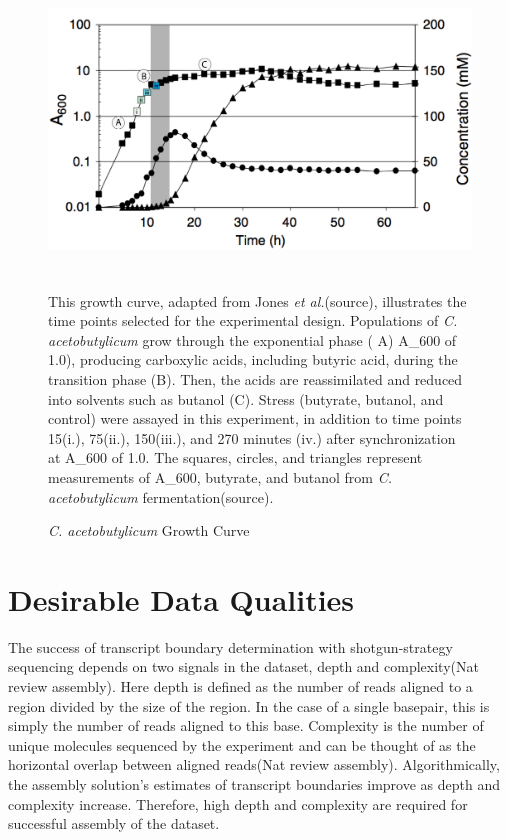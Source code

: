 \begin{figure}[t]
\small
\includegraphics[width=\textwidth,height=3in]{images/Sequencing/Growth_curve.png}
\caption{\textit{C. acetobutylicum} Growth Curve}
\label{fig:1}
This growth curve, adapted from Jones \textit{et al.}(source), illustrates the time points selected for the experimental design. Populations of \textit{C. acetobutylicum} grow through the exponential phase ( A) A_{600} of 1.0), producing carboxylic acids, including butyric acid, during the transition phase (B). Then, the acids are reassimilated and reduced into solvents such as butanol (C). Stress (butyrate, butanol, and control) were assayed in this experiment, in addition to time points 15(i.), 75(ii.), 150(iii.), and 270 minutes (iv.) after synchronization at A_{600} of 1.0. The squares, circles, and triangles represent measurements of A_600, butyrate, and butanol from \textit{C. acetobutylicum} fermentation(source).
\end{figure}

\section{Desirable Data Qualities}
The success of transcript boundary determination with shotgun-strategy sequencing depends on two signals in the dataset, depth and complexity(Nat review assembly). Here depth is defined as the number of reads aligned to a region divided by the size of the region. In the case of a single basepair, this is simply the number of reads aligned to this base. Complexity is the number of unique molecules sequenced by the experiment and can be thought of as the horizontal overlap between aligned reads(Nat review assembly). Algorithmically, the assembly solution's estimates of transcript boundaries improve as depth and complexity increase. Therefore, high depth and complexity are required for successful assembly of the dataset.


